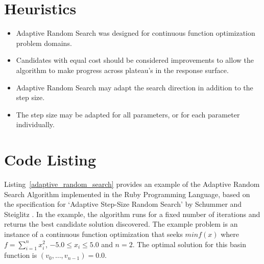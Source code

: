 \documentclass[a4paper, 11pt]{article}
\begin{document}
\section{Heuristics}
\label{sec:heuristics}
\begin{itemize}
	\item Adaptive Random Search was designed for continuous function optimization problem domains.
	\item Candidates with equal cost should be considered improvements to allow the algorithm to make progress across plateau's in the response surface.
	\item Adaptive Random Search may adapt the search direction in addition to the step size.
	\item The step size may be adapted for all parameters, or for each parameter individually.
\end{itemize}

\section{Code Listing}
\label{sec:code}
Listing~\ref{adaptive_random_search} provides an example of the Adaptive Random Search Algorithm implemented in the Ruby Programming Language, based on the specification for `Adaptive Step-Size Random Search' by Schummer and Steiglitz \cite{Schumer1968}. 
In the example, the algorithm runs for a fixed number of iterations and returns the best candidate solution discovered. 
The example problem is an instance of a continuous function optimization that seeks $min f(x)$ where $f=\sum_{i=1}^n x_{i}^2$, $-5.0\leq x_i \leq 5.0$ and $n=2$. The optimal solution for this basin function is $(v_0,\ldots,v_{n-1})=0.0$.
\end{document}
